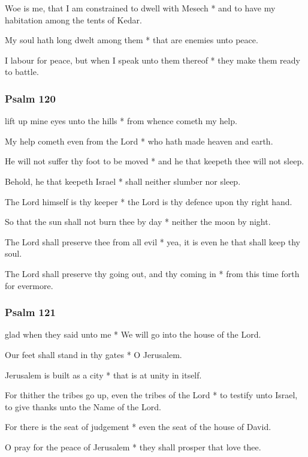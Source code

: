 Woe is me, that I am constrained to dwell with Mesech * and to have my habitation among the tents of Kedar.

My soul hath long dwelt among them * that are enemies unto peace.

I labour for peace, but when I speak unto them thereof * they make them ready to battle.

\subsubsection{Psalm 120}


 lift up mine eyes unto the hills * from whence cometh my help.

My help cometh even from the Lord * who hath made heaven and earth.

He will not suffer thy foot to be moved * and he that keepeth thee will not sleep.

Behold, he that keepeth Israel * shall neither slumber nor sleep.

The Lord himself is thy keeper * the Lord is thy defence upon thy right hand.

So that the sun shall not burn thee by day * neither the moon by night.

The Lord shall preserve thee from all evil * yea, it is even he that shall keep thy soul.

The Lord shall preserve thy going out, and thy coming in * from this time forth for evermore.

\subsubsection{Psalm 121}


 glad when they said unto me * We will go into the house of the Lord.

Our feet shall stand in thy gates * O Jerusalem.

Jerusalem is built as a city * that is at unity in itself.

For thither the tribes go up, even the tribes of the Lord * to testify unto Israel, to give thanks unto the Name of the Lord.

For there is the seat of judgement * even the seat of the house of David.

O pray for the peace of Jerusalem * they shall prosper that love thee.

